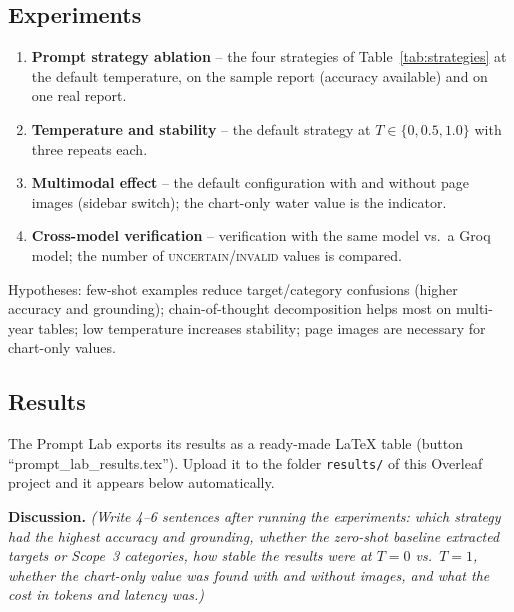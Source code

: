 \documentclass[11pt,a4paper]{article}
\newcommand{\code}[1]{\texttt{\small #1}}
\begin{document}
\subsection{Experiments}
\begin{enumerate}
  \item[E1] \textbf{Prompt strategy ablation} -- the four strategies of Table~\ref{tab:strategies} at the
        default temperature, on the sample report (accuracy available) and on one real report.
  \item[E2] \textbf{Temperature and stability} -- the default strategy at $T\in\{0, 0.5, 1.0\}$ with three
        repeats each.
  \item[E3] \textbf{Multimodal effect} -- the default configuration with and without page images
        (sidebar switch); the chart-only water value is the indicator.
  \item[E4] \textbf{Cross-model verification} -- verification with the same model vs.\ a Groq model; the
        number of \textsc{uncertain}/\textsc{invalid} values is compared.
\end{enumerate}
Hypotheses: few-shot examples reduce target/category confusions (higher accuracy and grounding);
chain-of-thought decomposition helps most on multi-year tables; low temperature increases stability; page
images are necessary for chart-only values.

\subsection{Results}
The Prompt Lab exports its results as a ready-made LaTeX table (button ``prompt\_lab\_results.tex''). Upload
it to the folder \code{results/} of this Overleaf project and it appears below automatically.


\textbf{Discussion.} \emph{(Write 4--6 sentences after running the experiments: which strategy had the highest
accuracy and grounding, whether the zero-shot baseline extracted targets or Scope~3 categories, how stable
the results were at $T=0$ vs.\ $T=1$, whether the chart-only value was found with and without images, and
what the cost in tokens and latency was.)}
\end{document}
